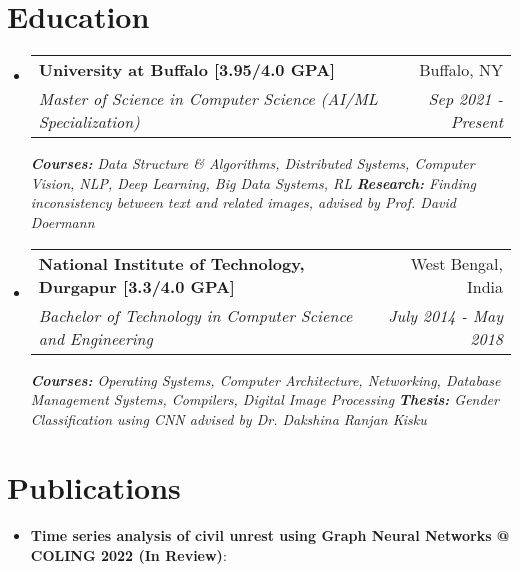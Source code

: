 \documentclass[a4paper,20pt]{article}
\makeatletter
\newcommand{\resumeItem}[2]{
  \item\small{
    \textbf{#1}{: #2 \vspace{-2pt}}
  }
}
\newcommand{\resumeSubheading}[4]{
  \vspace{-1pt}\item
    \begin{tabular*}{0.97\textwidth}{l@{\extracolsep{\fill}}r}
      \textbf{#1} & #2 \\
      \textit{#3} & \textit{#4} \\
    \end{tabular*}\vspace{-5pt}
}
\newcommand{\resumeSubItem}[2]{\resumeItem{#1}{#2}\vspace{-3pt}}
\newcommand{\resumeSubHeadingListStart}{\begin{itemize}[leftmargin=*]}
\newcommand{\resumeSubHeadingListEnd}{\end{itemize}}
\makeatother
\begin{document}
\section{Education}
  \resumeSubHeadingListStart
    \resumeSubheading
      {University at Buffalo [3.95/4.0 GPA] }{Buffalo, NY}
      {Master of Science in Computer Science (AI/ML Specialization)}{Sep 2021 - Present}
      {\scriptsize \textit{ \footnotesize{\newline{}\textbf{Courses:} Data Structure \& Algorithms, Distributed Systems, Computer Vision, NLP, Deep Learning, Big Data Systems, RL}}}
      {\scriptsize \textit{ \footnotesize{\newline{}\textbf{Research:} Finding inconsistency between text and related images, advised by Prof. David Doermann}}}
    \resumeSubHeadingListEnd
    
    \resumeSubHeadingListStart
    \resumeSubheading
      {National Institute of Technology, Durgapur [3.3/4.0 GPA]}{West Bengal, India}
      {Bachelor of Technology in Computer Science and Engineering}{July 2014 - May 2018}
      {\scriptsize \textit{ \footnotesize{\newline{}\textbf{Courses:} Operating Systems, Computer Architecture, Networking, Database Management Systems, Compilers, Digital Image Processing}}}
      {\scriptsize \textit{ \footnotesize{\newline{}\textbf{Thesis:} Gender Classification using CNN advised by Dr. Dakshina Ranjan Kisku}}}
    \resumeSubHeadingListEnd
	    
\vspace{-8pt}
\section{Publications}

\resumeSubHeadingListStart
\resumeSubItem{Time series analysis of civil unrest using Graph Neural Networks @ COLING 2022 (In Review)}{}
\vspace{2pt}
\resumeSubHeadingListEnd
\end{document}
